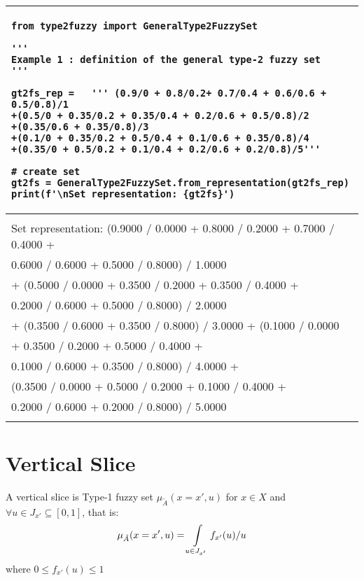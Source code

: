 \documentclass[]{article}
\begin{document}
\begin{tabular}{|l|}
\hline 
\lstset{language=Python}
\lstset{basicstyle=\scriptsize}
\begin{lstlisting}
from type2fuzzy import GeneralType2FuzzySet

'''
Example 1 : definition of the general type-2 fuzzy set
'''

gt2fs_rep =   ''' (0.9/0 + 0.8/0.2+ 0.7/0.4 + 0.6/0.6 + 0.5/0.8)/1
+(0.5/0 + 0.35/0.2 + 0.35/0.4 + 0.2/0.6 + 0.5/0.8)/2
+(0.35/0.6 + 0.35/0.8)/3
+(0.1/0 + 0.35/0.2 + 0.5/0.4 + 0.1/0.6 + 0.35/0.8)/4
+(0.35/0 + 0.5/0.2 + 0.1/0.4 + 0.2/0.6 + 0.2/0.8)/5'''

# create set
gt2fs = GeneralType2FuzzySet.from_representation(gt2fs_rep)
print(f'\nSet representation: {gt2fs}')
\end{lstlisting}
\\
\hline
\\
Set representation:
{\small (0.9000 / 0.0000 + 0.8000 / 0.2000 + 0.7000 / 0.4000 + }\\
{\small 0.6000 / 0.6000 + 0.5000 / 0.8000) / 1.0000}\\
{\small + (0.5000 / 0.0000 + 0.3500 / 0.2000 + 0.3500 / 0.4000 + }\\
{\small 0.2000 / 0.6000 + 0.5000 / 0.8000) / 2.0000 }\\
{\small + (0.3500 / 0.6000 + 0.3500 / 0.8000) / 3.0000 + (0.1000 / 0.0000}\\
{\small + 0.3500 / 0.2000 + 0.5000 / 0.4000 +}\\
{\small 0.1000 / 0.6000 + 0.3500 / 0.8000) / 4.0000 +} \\
{\small (0.3500 / 0.0000 + 0.5000 / 0.2000 + 0.1000 / 0.4000 +} \\
{\small 0.2000 / 0.6000 + 0.2000 / 0.8000) / 5.0000}\\
\\ 
\hline 
\end{tabular} 


\section{Vertical Slice}

 A vertical slice is Type-1 fuzzy set $\mu_{\tilde{A}}(x=x',u)$ for $x\in X$ and $\forall u \in J_{x'}\subseteq[0,1]$, that is:
\begin{equation}
\mu_{\tilde{A}}(x=x',u)=\int\displaylimits_{u\in J_{x'}}f_{x'}(u)\slash u
\end{equation} 
where $0\leq f_{x'}(u)\leq 1$
\end{document}
